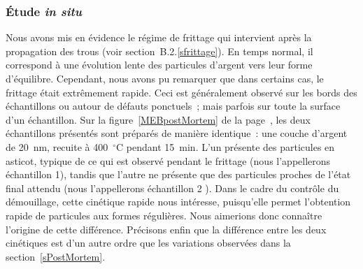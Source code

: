 \subsubsection{Étude \textit{in situ}}
Nous avons mis en évidence le régime de frittage qui intervient après la propagation des trous (voir section~B.2.\ref{sfrittage}). En temps normal, il correspond à une évolution lente des particules d'argent vers leur forme d'équilibre. Cependant, nous avons pu remarquer que dans certains cas, le frittage était extrêmement rapide. Ceci est généralement observé sur les bords des échantillons ou autour de défauts ponctuels~; mais parfois sur toute la surface d'un échantillon. Sur la figure~\ref{MEBpostMortem} de la page~\pageref{MEBpostMortem}, les deux échantillons présentés sont préparés de manière identique~: une couche d'argent de 20~nm, recuite à 400~$^\circ$C pendant 15~min. L'un présente des particules en asticot, typique de ce qui est observé pendant le frittage (nous l'appellerons \og échantillon 1\fg), tandis que l'autre ne présente que des particules proches de l'état final attendu (nous l'appellerons \og échantillon 2 \fg). Dans le cadre du contrôle du démouillage, cette cinétique rapide nous intéresse, puisqu'elle permet l'obtention rapide de particules aux formes régulières. Nous aimerions donc connaître l'origine de cette différence. Précisons enfin que la différence entre les deux cinétiques est d'un autre ordre que les variations observées dans la section~\ref{sPostMortem}.\\[12pt]

